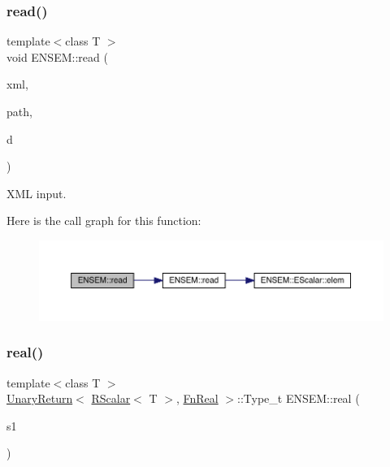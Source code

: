 \subsubsection{\texorpdfstring{read()}{read()}\hspace{0.1cm}{\footnotesize\ttfamily [2/2]}}
{\footnotesize\ttfamily template$<$class T $>$ \\
void E\+N\+S\+E\+M\+::read (\begin{DoxyParamCaption}\item[{\mbox{\hyperlink{classADATXML_1_1XMLReader}{A\+D\+A\+T\+X\+M\+L\+::\+X\+M\+L\+Reader}} \&}]{xml,  }\item[{const std\+::string \&}]{path,  }\item[{\mbox{\hyperlink{classENSEM_1_1RScalar}{R\+Scalar}}$<$ T $>$ \&}]{d }\end{DoxyParamCaption})\hspace{0.3cm}{\ttfamily [inline]}}



X\+ML input. 

Here is the call graph for this function\+:\nopagebreak
\begin{figure}[H]
\begin{center}
\leavevmode
\includegraphics[width=350pt]{d9/ded/group__rscalar_ga254ddc2517282f105035865bc1e227dc_cgraph}
\end{center}
\end{figure}
\mbox{\label{group__rscalar_ga50a51e948d621f811040859a236b48f9}} 
\subsubsection{\texorpdfstring{real()}{real()}}
{\footnotesize\ttfamily template$<$class T $>$ \\
\mbox{\hyperlink{structENSEM_1_1UnaryReturn}{Unary\+Return}}$<$ \mbox{\hyperlink{classENSEM_1_1RScalar}{R\+Scalar}}$<$ T $>$, \mbox{\hyperlink{structENSEM_1_1FnReal}{Fn\+Real}} $>$\+::Type\+\_\+t E\+N\+S\+E\+M\+::real (\begin{DoxyParamCaption}\item[{const \mbox{\hyperlink{classENSEM_1_1RScalar}{R\+Scalar}}$<$ T $>$ \&}]{s1 }\end{DoxyParamCaption})\hspace{0.3cm}{\ttfamily [inline]}}

